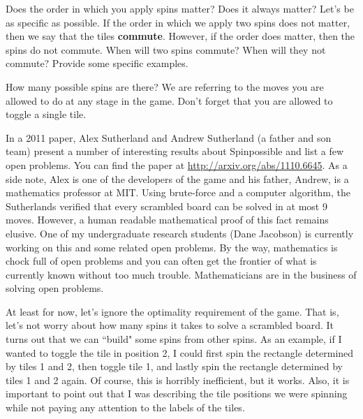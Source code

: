 \begin{exercise}
Does the order in which you apply spins matter?  Does it always matter?  Let's be as specific as possible.  If the order in which we apply two spins does not matter, then we say that the tiles \textbf{commute}.  However, if the order does matter, then the spins do not commute.  When will two spins commute?  When will they not commute?  Provide some specific examples.
\end{exercise}

\begin{exercise}
How many possible spins are there?  We are referring to the moves you are allowed to do at any stage in the game.  Don't forget that you are allowed to toggle a single tile.
\end{exercise}

In a 2011 paper, Alex Sutherland and Andrew Sutherland (a father and son team) present a number of interesting results about Spinpossible and list a few open problems. You can find the paper at \url{http://arxiv.org/abs/1110.6645}. As a side note, Alex is one of the developers of the game and his father, Andrew, is a mathematics professor at MIT. Using brute-force and a computer algorithm, the Sutherlands verified that every scrambled board can be solved in at most 9 moves. However, a human readable mathematical proof of this fact remains elusive.  One of my undergraduate research students (Dane Jacobson) is currently working on this and some related open problems.  By the way, mathematics is chock full of open problems and you can often get the frontier of what is currently known without too much trouble.  Mathematicians are in the business of solving open problems.

At least for now, let's ignore the optimality requirement of the game.  That is, let's not worry about how many spins it takes to solve a scrambled board.  It turns out that we can ``build" some spins from other spins.  As an example, if I wanted to toggle the tile in position 2, I could first spin the rectangle determined by tiles 1 and 2, then toggle tile 1, and lastly spin the rectangle determined by tiles 1 and 2 again.  Of course, this is horribly inefficient, but it works.  Also, it is important to point out that I was describing the tile positions we were spinning while not paying any attention to the labels of the tiles.

